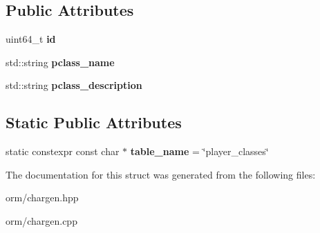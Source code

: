 \subsection*{Public Attributes}
\begin{DoxyCompactItemize}
\item 
\mbox{\label{structmods_1_1orm_1_1player__classes_a30237ea2db2a03ef14bd4fcb79db754f}} 
uint64\+\_\+t {\bfseries id}
\item 
\mbox{\label{structmods_1_1orm_1_1player__classes_ae06b81583ac8c40fc7d39bebeb94f17b}} 
std\+::string {\bfseries pclass\+\_\+name}
\item 
\mbox{\label{structmods_1_1orm_1_1player__classes_adb10e56a5801da05c8da166bd3f6a92f}} 
std\+::string {\bfseries pclass\+\_\+description}
\end{DoxyCompactItemize}
\subsection*{Static Public Attributes}
\begin{DoxyCompactItemize}
\item 
\mbox{\label{structmods_1_1orm_1_1player__classes_a8ce643ccc8239d42e607f6a0ed518cab}} 
static constexpr const char $\ast$ {\bfseries table\+\_\+name} = \char`\"{}player\+\_\+classes\char`\"{}
\end{DoxyCompactItemize}


The documentation for this struct was generated from the following files\+:\begin{DoxyCompactItemize}
\item 
orm/chargen.\+hpp\item 
orm/chargen.\+cpp\end{DoxyCompactItemize}
